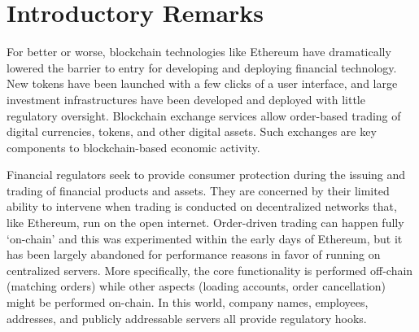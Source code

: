 
\section{Introductory Remarks}


For better or worse, blockchain technologies like Ethereum have dramatically lowered the barrier to entry for developing and deploying financial technology. New tokens have been launched with a few clicks of a user interface, and large investment infrastructures have been developed and deployed with little regulatory oversight. Blockchain exchange services allow order-based trading of digital currencies, tokens, and other digital assets. Such exchanges are key components to blockchain-based economic activity.

Financial regulators seek to provide consumer protection during the issuing and trading of financial products and assets. They are concerned by their limited ability to intervene when trading is conducted on decentralized networks that, like Ethereum, run on the open internet. Order-driven trading can happen fully `on-chain' and this was experimented within the early days of Ethereum, but it has been largely abandoned for performance reasons in favor of running on centralized servers. More specifically, the core functionality is performed off-chain (\eg matching orders) while other aspects (\eg loading accounts, order cancellation) might be performed on-chain. In this world, company names, employees, addresses, and publicly addressable servers all provide regulatory hooks.


